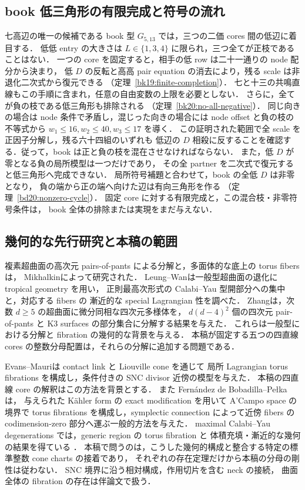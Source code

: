 \subsection{book 低三角形の有限完成と符号の流れ}

七高辺の唯一の候補である book 型 $G_{5,13}$ では，三つの二価 cores 間の低辺に着目する．
低低 entry の大きさは $L\in\{1,3,4\}$ に限られ，三つ全てが正枝であることはない．
一つの core を固定すると，相手の低 row は二十一通りの node 配分から決まり，
低 $D$ の反転と高高 pair equation の消去により，残る scale は非退化二次式から復元できる
（定理~\ref{bk19:finite-completion}）．
七と十三の共鳴直線もこの手順に含まれ，任意の自由変数の上限を必要としない．
さらに，全てが負の枝である低三角形も排除される
（定理~\ref{bk20:no-all-negative}）．
同じ向きの場合は node 条件で矛盾し，混じった向きの場合には
node offset と負の枝の不等式から $w_1\le16,w_2\le40,w_3\le17$ を導く．
この証明された範囲で全 scale を正因子分解し，残る六十四組のいずれも
低辺の $D$ 相殺に反することを確認する．従って，book は正と負の枝を混在させなければならない．
また，低 $D$ が零となる負の局所模型は一つだけであり，
その全 partner を二次式で復元すると低三角形へ完成できない．
局所符号補題と合わせて，book の全低 $D$ は非零となり，
負の端から正の端へ向けた辺は有向三角形を作る
（定理~\ref{bd20:nonzero-cycle}）．
固定 core に対する有限完成と，この混合枝・非零符号条件は，
book 全体の排除または実現をまだ与えない．

\subsection{幾何的な先行研究と本稿の範囲}

複素超曲面の高次元 pairs-of-pants による分解と，多面体的な底上の torus fibers は，
Mikhalkin\cite[Theorems~1 and~1$'$]{Mikhalkin}によって研究された．
Leung--Wan\cite{LeungWan}は一般型超曲面の退化に tropical geometry を用い，
正則最高次形式の Calabi--Yau 型開部分への集中と，対応する fibers の
漸近的な special Lagrangian 性を調べた．
Zhang\cite[Theorem~1.1]{Zhang}は，次数 $d\ge5$ の超曲面に微分同相な四次元多様体を，
$d(d-4)^2$ 個の四次元 pair-of-pants と K3 surfaces の部分集合に分解する結果を与えた．
これらは一般型における分解と fibration の幾何的な背景を与える．
本稿が固定する五つの四直線 cores の整数分母配置は，それらの分解に追加する問題である．

Evans--Mauri\cite{EM}は contact link と Liouville cone を通じて
局所 Lagrangian torus fibrations を構成し，条件付きの SNC divisor 近傍の模型を与えた．
本稿の四直線 core の解釈はこの方法を背景とする．
また Fernández de Bobadilla--Pełka\cite[Theorem~6.14]{FernandezBobadillaPelka}は，
与えられた Kähler form の exact modification を用いて A'Campo space の境界で
torus fibrations を構成し，symplectic connection によって近傍 fibers の
codimension-zero 部分へ運ぶ一般的方法を与えた．
maximal Calabi--Yau degenerations では，generic region の torus fibration と
体積充填・漸近的な幾何の結果を得ている
\cite[Theorems~1.1--1.2]{FernandezBobadillaPelka}．
本稿で問うのは，こうした幾何的構成と整合する特定の標準整数 cone charts の接着であり，
それぞれの存在定理だけから本稿の分母の剛性は従わない．
SNC 境界に沿う相対構成，作用切片を含む neck の接続，
曲面全体の fibration の存在は伴論文\cite{SurfaceGeometry}で扱う．

